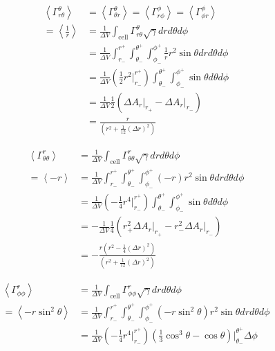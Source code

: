 \begin{align}
\left<\Gamma^{\theta}_{r \theta} \right> &= \left<\Gamma^{\theta}_{ \theta r} \right>  = \left<\Gamma^{\phi}_{r \phi} \right> = \left<\Gamma^{\phi}_{\phi r} \right> \\
 = \left<\frac{1}{r}\right>&= \frac{1}{\Delta V} \int_{\text{cell}} \Gamma^{\theta}_{r \theta} \sqrt{\gamma} dr d\theta d\phi \\
         &= \frac{1}{\Delta V} \int_{r_-}^{r^+} \int_{\theta_-}^{\theta^+} \int_{\phi_-}^{\phi^+} \frac{1}{r} r^2 \sin \theta dr d\theta d\phi \\
         &= \frac{1}{\Delta V} \left( \frac{1}{2} r^2 \Big|_{r_-}^{r^+} \right) \int_{\theta_-}^{\theta^+} \int_{\phi_-}^{\phi^+} \sin \theta d\theta d\phi \\
	 &= \frac{1}{\Delta V} \frac{1}{2} \left( \Delta A_r\Big|_{r_+} - \Delta A_r\Big|_{r_-} \right) \\
         &= \frac{ r }{ \left(r^2 + \frac{1}{12}\left(\Delta r\right)^2 \right) }
\end{align}

\begin{align}
\left<\Gamma^{r}_{\theta \theta} \right> &= \frac{1}{\Delta V} \int_{\text{cell}} \Gamma^{r }_{\theta \theta} \sqrt{\gamma} dr d\theta d\phi \\
          = \left< {-r}\right> &= \frac{1}{\Delta V} \int_{r_-}^{r^+} \int_{\theta_-}^{\theta^+} \int_{\phi_-}^{\phi^+} (-r) r^2 \sin \theta dr d\theta d\phi \\
         &= \frac{1}{\Delta V} \left( -\frac{1}{4} r^4 \Big|_{r_-}^{r^+} \right) \int_{\theta_-}^{\theta^+} \int_{\phi_-}^{\phi^+} \sin \theta d\theta d\phi \\
	 &= -\frac{1}{\Delta V} \frac{1}{4} \left( r_+^2\Delta A_r\Big|_{r_+} - r_-^2\Delta A_r\Big|_{r_-} \right) \\
         &= - \frac{ r \left( r^2 - \frac{1}{4}\left(\Delta r\right)^2\right)  }{ \left(r^2 + \frac{1}{12}\left(\Delta r\right)^2 \right) }
\end{align}

\begin{align}
\left<\Gamma^{r}_{\phi \phi} \right> &= \frac{1}{\Delta V} \int_{\text{cell}} \Gamma^{r}_{\phi \phi} \sqrt{\gamma} dr d\theta d\phi \\
          = \left< {-r \sin^2 \theta }\right> &= \frac{1}{\Delta V} \int_{r_-}^{r^+} \int_{\theta_-}^{\theta^+} \int_{\phi_-}^{\phi^+} (-r \sin^2 \theta) r^2 \sin \theta dr d\theta d\phi \\
         &= \frac{1}{\Delta V} \left( -\frac{1}{4} r^4 \Big|_{r_-}^{r^+} \right) \left(\frac{1}{3}\cos^3\theta - \cos\theta\right)\Big|_{\theta_-}^{\theta^+} \Delta \phi 
\end{align}

